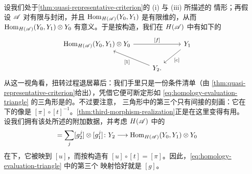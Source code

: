 \begin{remark}\label{thm:exactness-from-conditions}
设我们处于\cref{thm:quasi-representative-criterion}的 (i) 与 (iii) 所描述的
情形；再假设 $\mathscr{A}$ 对有限\trDirectSum{}与\trSuspension{}封闭，并且
$\operatorname{Hom}_{H(\mathscr{A})}(Y_0,Y_1)$ 是有限维的，从而 $\operatorname{Hom}_{H(\mathscr{A})}(Y_0,Y_1)\otimes
Y_0$ 有意义。于是按构造，我们在 $H(\mathscr{A})$ 中有如下的\trExactTriangle
\begin{equation}\label{eq:homology-evaluation-triangle}
\begin{tikzcd}
\Hom_{H(\scr{A})}(Y_0,Y_1)\otimes Y_0 \ar[rr,"{[f]}"] && Y_1
\ar[dl,"{[c]}"] \\
& Y_2. \ar[ul,"{[1]}"] &
\end{tikzcd}
\end{equation}
从这一视角看，扭转过程退居幕后：我们手里只是一份条件清单（由%
\cref{thm:quasi-representative-criterion}给出），凭借它便可断定形如
\eqref{eq:homology-evaluation-triangle} 的三角形是\trExact{}的。不过要注意，
三角形中的第三个\trMorphism{}只有间接的刻画：它在\trYonedaEmbedding{}下的像是
$[\pi]\circ[t]^{-1}$。\cref{thm:third-morphism-realization}正是在这里变得有用。
设我们拥有该处所述的附加数据，并考虑 $H(\mathscr{A})$ 中的\trMorphism
\begin{equation*}
[g]=\sum_j[g_2^j]\otimes[g_1^j]\colon Y_2\longrightarrow
\Hom_{H(\scr{A})}(Y_0,Y_1)\otimes Y_0
\end{equation*}
在\trYonedaEmbedding{}下，它被映到\trModule\trHomomorphism{} $[u]$，而按构造有
$[u]\circ[t]=[\pi]$。因此，\eqref{eq:homology-evaluation-triangle} 中的第三个
映射恰好就是 $[g]$。
\end{remark}
